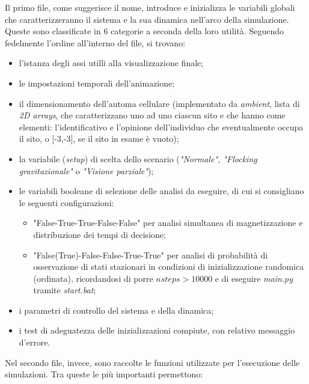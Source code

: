 \documentclass[letterpaper,10pt]{article}
\begin{document}
Il primo file, come suggerisce il nome, introduce e inizializza le variabili globali che caratterizzeranno il sistema e la sua dinamica nell'arco della simulazione. Queste sono classificate in 6 categorie a seconda della loro utilità. Seguendo fedelmente l'ordine all'interno del file, si trovano:

\begin{itemize}
  \item l'istanza degli assi utilli alla visualizzazione finale;
  \item le impostazioni temporali dell'animazione;
  \item il dimensionamento dell'automa cellulare (implementato da \textit{ambient}, lista di \textit{2D arrays}, che caratterizzano uno ad uno ciascun sito e che hanno come elementi: l'identificativo e l'opinione dell'individuo che eventualmente occupa il sito, o [-3,-3], se il sito in esame è vuoto);
  \item la variabile (\textit{setup}) di scelta dello scenario (\textit{"Normale", "Flocking gravitazionale"} o \textit{"Visione parziale"});
  \item le variabili booleane di selezione delle analisi da eseguire, di cui si consigliano le seguenti configurazioni:
\begin{itemize}
  \item "False-True-True-False-False" per analisi simultanea di magnetizzazione e distribuzione dei tempi di decisione;
  \item "False(True)-False-False-True-True" per analisi di probabilità di osservazione di stati stazionari in condizioni di inizializzazione randomica (ordinata), ricordandosi di porre $nsteps > 10000$ e di eseguire \textit{main.py} tramite \textit{start.bat};
\end{itemize}
  \item i parametri di controllo del sistema e della dinamica;
  \item i test di adeguatezza delle inizializzazioni compiute, con relativo messaggio d'errore.
\end{itemize}

Nel secondo file, invece, sono raccolte le funzioni utilizzate per l'esecuzione delle simulazioni. Tra queste le più importanti permettono:
\end{document}
